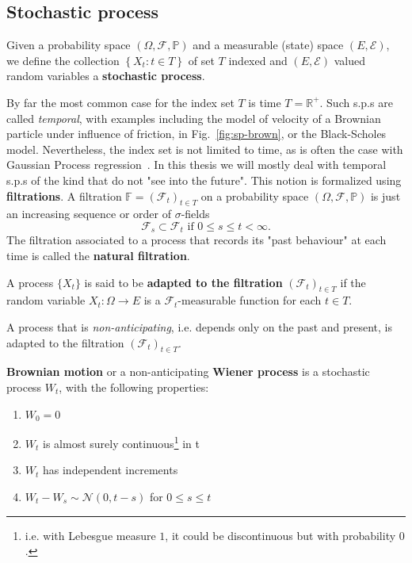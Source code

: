 \subsection{Stochastic process}
\begin{definition}
		Given a probability space $(\Omega, \mathcal{F}, \mathbb{P})$ and a measurable (state) space $(E, \mathcal{E})$, we define the collection $\left\{X_{t}: t \in T\right\}$ of set $T$ indexed and $(E, \mathcal{E})$ valued random variables a \textbf{stochastic process}.
\end{definition}
By far the most common case for the index set $T$ is time $T = \mathbb{R}^+$. Such s.p.s are called \emph{temporal}, with examples including the model of velocity of a Brownian particle under influence of friction, in Fig.~\ref{fig:sp-brown}, or the Black-Scholes model. Nevertheless, the index set is not limited to time, as is often the case with Gaussian Process regression~\cite{rasmussen2006gaussian}. In this thesis we will mostly deal with temporal s.p.s of the kind that do not "see into the future". This notion is formalized using \textbf{filtrations}. A filtration $\mathbb{F}=\left(\mathcal{F}_{t}\right)_{t \in T}$ on a probability space $(\Omega, \mathcal{F}, \mathbb{P})$ is just an increasing sequence or order of $\sigma$-fields
\begin{equation}
	\mathcal{F}_{s} \subset \mathcal{F}_{t} \text { if } 0 \leq s \leq t<\infty.
\end{equation}
The filtration associated to a process that records its "past behaviour" at each time is called the \textbf{natural filtration}. 
\begin{definition}
	A process $\{X_t\}$ is said to be \textbf{adapted to the filtration} $\left(\mathcal{F}_{t}\right)_{t \in T}$ if the random variable $X_t : \Omega \rightarrow E$ is a $\mathcal{F}_t$-measurable function for each $t \in T$. 
\end{definition}
A process that is \emph{non-anticipating}, i.e. depends only on the past and present, is adapted to the filtration $\left(\mathcal{F}_{t}\right)_{t \in T}$.
\begin{definition}
	\textbf{Brownian motion} or a non-anticipating \textbf{Wiener process} is a stochastic process $W_t$, with the following properties:
	\begin{enumerate}[label=\roman*)]
		\item $W_0 = 0$
		\item $W_t$ is almost surely continuous\footnote{i.e. with Lebesgue measure $1$, it could be discontinuous but with probability $0$.} in t
		\item $W_t$ has independent increments
		\item $W_t - W_s \sim \mathcal{N} (0, t-s)$ for $0 \leq s \leq t$
	\end{enumerate}
\end{definition}
